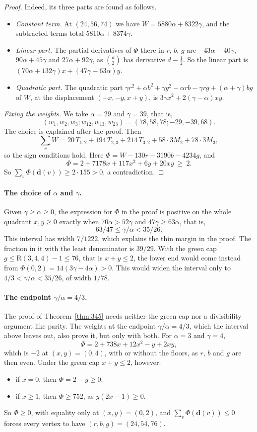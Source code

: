 \documentclass[11pt]{article}
\theoremstyle{spacedplain}
\theoremstyle{spaceddef}
\theoremstyle{spacedremark}
\newcommand{\R}{\mathrm{R}}
\begin{document}
\begin{proof}
Indeed, its three parts are found as follows.
\begin{itemize}
\item \emph{Constant term.}
At $(24,56,74)$ we have $W=5880\alpha+8322\gamma$, and the subtracted terms total $5810\alpha+8374\gamma$.
\item \emph{Linear part.}
The partial derivatives of $\Phi$ there in $r$, $b$, $g$ are $-43\alpha-40\gamma$, $90\alpha+45\gamma$ and $27\alpha+92\gamma$, as $\binom d2$ has derivative $d-\frac12$.
So the linear part is $(70\alpha+132\gamma)x+(47\gamma-63\alpha)y$.
\item \emph{Quadratic part.}
The quadratic part $\gamma r^2+\alpha b^2+\gamma g^2-\alpha rb-\gamma rg+(\alpha+\gamma)bg$ of $W$, at the displacement $(-x,-y,x+y)$, is $3\gamma x^2+2(\gamma-\alpha)xy$.
\end{itemize}

\emph{Fixing the weights.}
We take $\alpha=29$ and $\gamma=39$, that is,
\[
(w_1,w_2,w_3;w_{12},w_{13},w_{23})=(78,58,78;-29,-39,68).
\]
The choice is explained after the proof.
Then
\[
\sum_vW=20\,T_{1,2}+194\,T_{2,3}+214\,T_{3,2}+58\cdot 3M_2+78\cdot 3M_3,
\]
so the sign conditions hold.
Here $\Phi=W-130r-3190b-4234g$, and
\[
\Phi=2+7178x+117x^2+6y+20xy\ \ge\ 2 .
\]
So $\sum_v\Phi(\mathbf d(v))\ge 2\cdot 155>0$, a contradiction.
\end{proof}

\paragraph{The choice of $\alpha$ and $\gamma$.}
Given $\gamma\ge\alpha\ge 0$, the expression for $\Phi$ in the proof is positive on the whole quadrant $x,y\ge 0$ exactly when $70\alpha>52\gamma$ and $47\gamma\ge 63\alpha$, that is,
\[
63/47\le\gamma/\alpha<35/26 .
\]
This interval has width $7/1222$, which explains the thin margin in the proof.
The fraction in it with the least denominator is $39/29$.
With the green cap $g\le\R(3,4,4)-1\le 76$, that is $x+y\le 2$, the lower end would come instead from $\Phi(0,2)=14(3\gamma-4\alpha)>0$.
This would widen the interval only to $4/3<\gamma/\alpha<35/26$, of width $1/78$.

\paragraph{The endpoint $\gamma/\alpha=4/3$.}
The proof of Theorem~\ref{thm:345} needs neither the green cap nor a divisibility argument like parity.
The weights at the endpoint $\gamma/\alpha=4/3$, which the interval above leaves out, also prove it, but only with both.
For $\alpha=3$ and $\gamma=4$,
\[
\Phi=2+738x+12x^2-y+2xy,
\]
which is $-2$ at $(x,y)=(0,4)$, with or without the floors, as $r$, $b$ and $g$ are then even.
Under the green cap $x+y\le 2$, however:
\begin{itemize}
\item if $x=0$, then $\Phi=2-y\ge 0$;
\item if $x\ge 1$, then $\Phi\ge 752$, as $y(2x-1)\ge 0$.
\end{itemize}
So $\Phi\ge 0$, with equality only at $(x,y)=(0,2)$, and $\sum_v\Phi(\mathbf d(v))\le 0$ forces every vertex to have $(r,b,g)=(24,54,76)$.
\end{document}
